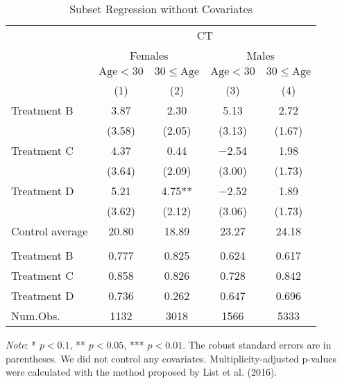 \documentclass[12pt, a4paper]{article}
\begin{document}
\begin{table}[H]

\caption{\label{tab:test-lm-subset1}Subset Regression without Covariates}
\centering
\fontsize{8}{10}\selectfont
\begin{threeparttable}
\begin{tabular}[t]{lcccc}
\toprule
\multicolumn{1}{c}{ } & \multicolumn{4}{c}{CT} \\
\cmidrule(l{3pt}r{3pt}){2-5}
\multicolumn{1}{c}{ } & \multicolumn{2}{c}{Females} & \multicolumn{2}{c}{Males} \\
\cmidrule(l{3pt}r{3pt}){2-3} \cmidrule(l{3pt}r{3pt}){4-5}
\multicolumn{1}{c}{ } & \multicolumn{1}{c}{$\text{Age} < 30$} & \multicolumn{1}{c}{$30 \le \text{Age}$} & \multicolumn{1}{c}{$\text{Age} < 30$} & \multicolumn{1}{c}{$30 \le \text{Age}$} \\
\cmidrule(l{3pt}r{3pt}){2-2} \cmidrule(l{3pt}r{3pt}){3-3} \cmidrule(l{3pt}r{3pt}){4-4} \cmidrule(l{3pt}r{3pt}){5-5}
  & (1) & (2) & (3) & (4)\\
\midrule
Treatment B & \num{3.87} & \num{2.30} & \num{5.13} & \num{2.72}\\
 & (\num{3.58}) & (\num{2.05}) & (\num{3.13}) & (\num{1.67})\\
Treatment C & \num{4.37} & \num{0.44} & \num{-2.54} & \num{1.98}\\
 & (\num{3.64}) & (\num{2.09}) & (\num{3.00}) & (\num{1.73})\\
Treatment D & \num{5.21} & \num{4.75}** & \num{-2.52} & \num{1.89}\\
 & (\num{3.62}) & (\num{2.12}) & (\num{3.06}) & (\num{1.73})\\
\midrule
Control average & 20.80 & 18.89 & 23.27 & 24.18\\
\addlinespace[0.3em]
\multicolumn{5}{l}{\textit{Multiplicity-adjusted p-values}}\\
\hspace{1em}Treatment B & 0.777 & 0.825 & 0.624 & 0.617\\
\hspace{1em}Treatment C & 0.858 & 0.826 & 0.728 & 0.842\\
\hspace{1em}Treatment D & 0.736 & 0.262 & 0.647 & 0.696\\
Num.Obs. & \num{1132} & \num{3018} & \num{1566} & \num{5333}\\
\bottomrule
\end{tabular}
\begin{tablenotes}
\item \emph{Note}: * $p < 0.1$, ** $p < 0.05$, *** $p < 0.01$. The robust standard errors are in parentheses. We did not control any covariates. Multiplicity-adjusted p-values were calculated with the method proposed by List et al. (2016).
\end{tablenotes}
\end{threeparttable}
\end{table}
\end{document}
